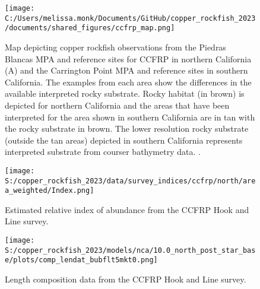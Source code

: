 \documentclass[11pt,
  letterpaper,
]{article}
\begin{document}
\begin{figure}
{\centering
\texttt{[image: C:/Users/melissa.monk/Documents/GitHub/copper\_rockfish\_2023/documents/shared\_figures/ccfrp\_map.png]}
}
\caption{Map depicting copper rockfish observations from the Piedras Blancas MPA and reference sites for CCFRP in northern California (A) and the Carrington Point MPA and reference sites in southern California. The examples from each area show the differences in the available interpreted rocky substrate. Rocky habitat (in brown) is depicted for northern California and the areas that have been interpreted for the area shown in southern California are in tan with the rocky substrate in brown.  The lower resolution rocky substrate (outside the tan areas) depicted in southern California represents interpreted substrate from courser bathymetry data. .\label{fig:ccfrp-map}}
\end{figure}

\begin{figure}
{\centering
\texttt{[image: S:/copper\_rockfish\_2023/data/survey\_indices/ccfrp/north/area\_weighted/Index.png]}
}
\caption{Estimated relative index of abundance from the CCFRP Hook and Line survey.\label{fig:ccfrp-index-main}}
\end{figure}

\pagebreak

\begin{figure}
{\centering
\texttt{[image: S:/copper\_rockfish\_2023/models/nca/10.0\_north\_post\_star\_base/plots/comp\_lendat\_bubflt5mkt0.png]}
}
\caption{Length composition data from the CCFRP Hook and Line survey.\label{fig:ccfrp-len-data}}
\end{figure}
\end{document}
